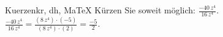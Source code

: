 \begin{MAufgabe}{Kuerzen}{kr, dh, MaTeX}
K\"urzen Sie soweit m\"oglich: $\frac{- 40\, z^4}{16\, z^4}$.\\ 
\ifLsg\MLoesung
\quad $\frac{- 40\, z^4}{16\, z^4}=\frac{(8\, z^4)\cdot(-5)}{(8\, z^4)\cdot(2)}=\frac{-5}{2}$.\else\relax\fi
 \end{MAufgabe}